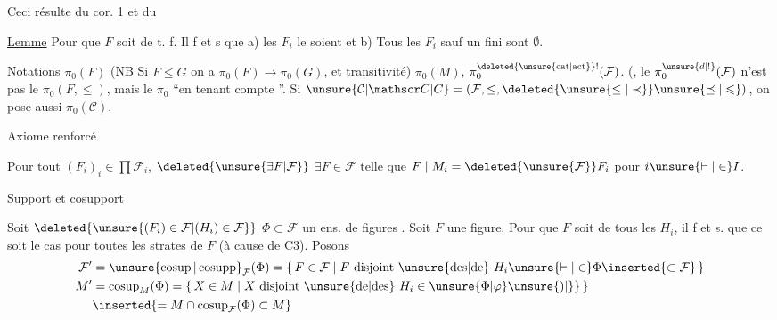 Ceci résulte du  cor. 1 et du

\uline{Lemme} Pour que $F$ soit de t. f. Il f et s que a) les $F_i$ le soient et b) Tous les $F_i$ sauf un  fini sont $\emptyset$.

Notations $\pi_0(F)$ (NB Si $F\leq G$ on a $\pi_0(F)\longrightarrow\pi_0(G)$, et transitivité) $\pi_0(M)$, $\pi_0^{\deleted{\unsure{\mathrm{cat}|\mathrm{act}}}!}(\mathcal F)$. (, le $\pi_0^{\unsure{d|!}}(\mathcal F)$ n'est pas le $\pi_0(F,\leq)$, mais le $\pi_0$ ``en tenant compte  ''. Si $\unsure{\mathcal C|\mathscr C|C}=(\mathcal F,\leq,\deleted{\unsure{\leq|\prec}}\unsure{\preceq|\leqslant})$, on pose aussi $\pi_0(\mathcal C)$.

Axiome renforcé

 Pour tout $(F_i)_i\in\prod\mathcal F_i$, $\deleted{\unsure{\exists F|\mathcal F}}$ $\exists F\in\mathcal F$ telle que $F\mid M_i=\deleted{\unsure{\mathcal F}}F_i$ pour $i\unsure{\vdash|\in}I$.

\uline{ } \uline{Support} \uline{et} \uline{cosupport}

Soit $\deleted{\unsure{(F_i)\in\mathcal F|(H_i)\in\mathcal F}}$ $\Phi\subset\mathcal F$ un ens. de figures .  Soit $F$ une figure. Pour  que $F$ soit  de tous les $H_i$, il f et s. que ce soit le cas pour toutes les strates de $F$ (à cause de C3).  Posons
\[
\begin{aligned}
\mathcal F'&=\unsure{\operatorname{cosup}|\operatorname{cosupp}}_{\mathcal F}(\Phi)=\{\,F\in\mathcal F\mid F\ \text{disjoint \unsure{des|de} }H_i\unsure{\vdash|\in}\Phi\inserted{\subset\mathcal F}\,\}\\
M'&=\operatorname{cosup}_{M}(\Phi)=\{\,X\in M\mid X\ \text{disjoint \unsure{de|des} }H_i\in\unsure{\Phi|\varphi}\unsure{)|\}}\,\}\\
&\inserted{=M\cap\operatorname{cosup}_{\mathcal F}(\Phi)\subset M}
\end{aligned}
\]


